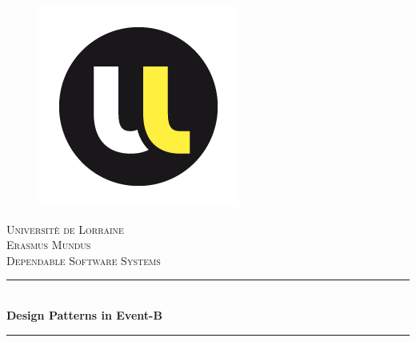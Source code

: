 \documentclass[12pt]{article}
\begin{document}
\begin{titlepage}

\newcommand{\HRule}{\rule{\linewidth}{0.5mm}} %

\center %
 
\begin{figure}
    \centering
\includegraphics{University_of_Lorraine_(logo).png}\\
\end{figure}
\textsc{\LARGE Universit\`{e} de Lorraine}\\[1cm] %

\textsc{\Large Erasmus Mundus}\\[0.5cm] %
\textsc{\large Dependable Software Systems}\\[0.5cm] %


\HRule \\[0.4cm]
{ \huge \bfseries Design Patterns in Event-B}\\[0.4cm] %
\HRule \\[1.5cm]
 


\end{titlepage}
\end{document}
